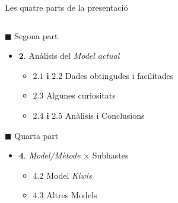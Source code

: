 \documentclass[twocolumn]{beamer}
\begin{document}
\begin{frame}{Les quatre parts de la presentació}
\begin{columns}[t]
\begin{column}{.5\textwidth}
   \begin{block}{$\blacksquare$ Segona part }
   	\begin{itemize}
   		\small
   		\item $\mathbf{2.}$ Anàlisis del \textit{Model actual}
   		\begin{itemize}
   			\footnotesize
   			\item $\mathbf{2.1 \text{ i } 2.2}$ Dades obtingudes i facilitades
   			\item $\mathbf{2.3}$ Algunes curiositats 
   			\item $\mathbf{2.4 \text{ i } 2.5}$ Anàlisis  i Conclusions
   		\end{itemize}
   	\end{itemize}
   	\normalsize
   \end{block}
       \begin{block}{$\blacksquare$ Quarta part}
       	\begin{itemize}
       		\small
       		\item $\mathbf{4.}$ \textit{Model/Mètode} $\times$ Subhastes
       		\begin{itemize}
       			\footnotesize
       			\item $\mathbf{4.2}$ Model \textit{Kiwis}
       			\item $\mathbf{4.3}$ Altres Models 
       		\end{itemize}
       	\end{itemize}
       \end{block}
\end{column}
\end{columns}
\end{frame}
%
\end{document}
